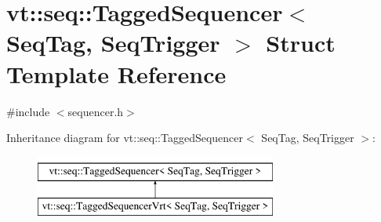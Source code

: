 \hypertarget{structvt_1_1seq_1_1_tagged_sequencer}{}\section{vt\+:\+:seq\+:\+:Tagged\+Sequencer$<$ Seq\+Tag, Seq\+Trigger $>$ Struct Template Reference}
\label{structvt_1_1seq_1_1_tagged_sequencer}


{\ttfamily \#include $<$sequencer.\+h$>$}

Inheritance diagram for vt\+:\+:seq\+:\+:Tagged\+Sequencer$<$ Seq\+Tag, Seq\+Trigger $>$\+:\begin{figure}[H]
\begin{center}
\leavevmode
\includegraphics[height=2.000000cm]{structvt_1_1seq_1_1_tagged_sequencer}
\end{center}
\end{figure}
